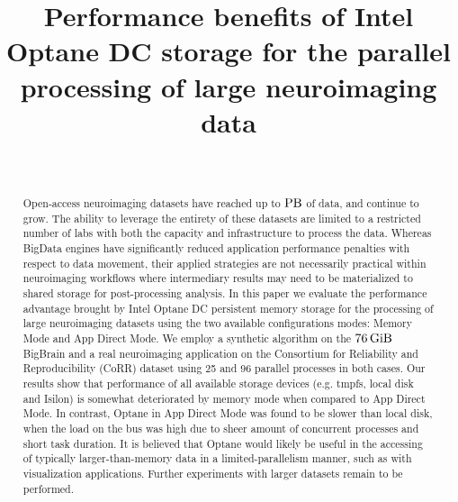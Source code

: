\documentclass[conference]{IEEEtran}
\newcommand{\bigbrain}{BigBrain\xspace}
\begin{document}
\title{Performance benefits of Intel Optane DC storage for the parallel processing of large neuroimaging data}

\author{\\
}
\maketitle

\begin{abstract}
    Open-access neuroimaging datasets have reached up to $\SI{}{\peta\byte}$ of data, and
    continue to grow. The ability to leverage the entirety of these datasets are
    limited to a restricted number of labs with both the capacity and infrastructure
    to process the data. Whereas BigData engines have significantly reduced
    application performance penalties with respect to data movement, their applied
    strategies are not necessarily practical within neuroimaging workflows where
    intermediary results may need to be materialized to shared storage for post-processing
    analysis. In this paper we evaluate the performance advantage brought by Intel
    Optane DC persistent memory storage for the processing of large neuroimaging 
    datasets using the two available configurations modes: Memory Mode and App Direct Mode.
    We employ a synthetic algorithm on the $\SI{76}{\gibi\byte}$ \bigbrain
    and a real neuroimaging application on the Consortium for Reliability and Reproducibility (CoRR)
    dataset using 25 and 96 parallel
    processes in both cases. Our results show that performance of all available storage
    devices (e.g. tmpfs, local disk and Isilon) is somewhat deteriorated by memory mode
    when compared to App Direct Mode. In contrast, Optane in App Direct Mode was
    found to be slower than local disk, when the load on the bus was high due to sheer
    amount of concurrent processes and short task duration. It is believed that
    Optane would likely be useful in the accessing of typically larger-than-memory
    data in a limited-parallelism manner, such as with visualization applications.
    Further experiments with larger datasets remain to be performed.

\end{abstract}
\end{document}
